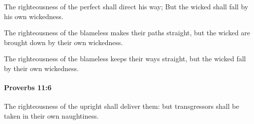 			\begin{versebox}
					\item[BHS] 
					\item[ASV] The righteousness of the perfect shall direct his way; But the wicked shall fall by his own wickedness.
					\item[NIV] The righteousness of the blameless makes their paths straight, but the wicked are brought down by their own wickedness.
					\item[NRSV] The righteousness of the blameless keeps their ways straight, but the wicked fall by their own wickedness.
			\end{versebox}

		\paragraph{Proverbs 11:6} %
			\label{PROVERBS-11-6}

			The righteousness of the upright shall deliver them: but transgressors shall be taken in their own naughtiness.

